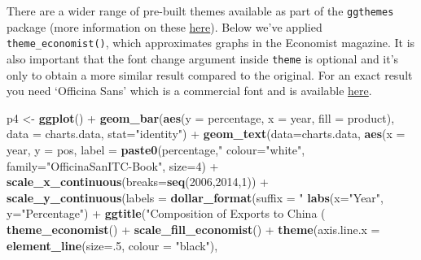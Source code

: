 \documentclass[]{article}
\newenvironment{Shaded}{\begin{snugshade}}{\end{snugshade}}
\newcommand{\KeywordTok}[1]{\textcolor[rgb]{0.13,0.29,0.53}{\textbf{{#1}}}}
\newcommand{\DataTypeTok}[1]{\textcolor[rgb]{0.13,0.29,0.53}{{#1}}}
\newcommand{\DecValTok}[1]{\textcolor[rgb]{0.00,0.00,0.81}{{#1}}}
\newcommand{\StringTok}[1]{\textcolor[rgb]{0.31,0.60,0.02}{{#1}}}
\newcommand{\NormalTok}[1]{{#1}}
\begin{document}
There are a wider range of pre-built themes available as part of the
\texttt{ggthemes} package (more information on these
\href{https://cran.r-project.org/web/packages/ggthemes/vignettes/ggthemes.html}{here}).
Below we've applied \texttt{theme\_economist()}, which approximates
graphs in the Economist magazine. It is also important that the font
change argument inside \texttt{theme} is optional and it's only to
obtain a more similar result compared to the original. For an exact
result you need `Officina Sans' which is a commercial font and is
available \href{http://www.myfonts.com/fonts/itc/officina-sans/}{here}.

\begin{Shaded}
\begin{Highlighting}[]
\NormalTok{p4 <-}\StringTok{ }\KeywordTok{ggplot}\NormalTok{() +}
\StringTok{      }\KeywordTok{geom_bar}\NormalTok{(}\KeywordTok{aes}\NormalTok{(}\DataTypeTok{y =} \NormalTok{percentage, }\DataTypeTok{x =} \NormalTok{year, }\DataTypeTok{fill =} \NormalTok{product), }\DataTypeTok{data =} \NormalTok{charts.data, }\DataTypeTok{stat=}\StringTok{"identity"}\NormalTok{) +}\StringTok{ }
\StringTok{      }\KeywordTok{geom_text}\NormalTok{(}\DataTypeTok{data=}\NormalTok{charts.data, }\KeywordTok{aes}\NormalTok{(}\DataTypeTok{x =} \NormalTok{year, }\DataTypeTok{y =} \NormalTok{pos, }\DataTypeTok{label =} \KeywordTok{paste0}\NormalTok{(percentage,}\StringTok{"%
                \DataTypeTok{colour=}\StringTok{"white"}\NormalTok{, }\DataTypeTok{family=}\StringTok{"OfficinaSanITC-Book"}\NormalTok{, }\DataTypeTok{size=}\DecValTok{4}\NormalTok{) +}\StringTok{ }
\StringTok{      }\KeywordTok{scale_x_continuous}\NormalTok{(}\DataTypeTok{breaks=}\KeywordTok{seq}\NormalTok{(}\DecValTok{2006}\NormalTok{,}\DecValTok{2014}\NormalTok{,}\DecValTok{1}\NormalTok{)) +}\StringTok{ }
\StringTok{      }\KeywordTok{scale_y_continuous}\NormalTok{(}\DataTypeTok{labels =} \KeywordTok{dollar_format}\NormalTok{(}\DataTypeTok{suffix =} \StringTok{"%
\StringTok{      }\KeywordTok{labs}\NormalTok{(}\DataTypeTok{x=}\StringTok{"Year"}\NormalTok{, }\DataTypeTok{y=}\StringTok{"Percentage"}\NormalTok{) +}\StringTok{ }
\StringTok{      }\KeywordTok{ggtitle}\NormalTok{(}\StringTok{"Composition of Exports to China (%
\StringTok{      }\KeywordTok{theme_economist}\NormalTok{() +}\StringTok{ }\KeywordTok{scale_fill_economist}\NormalTok{() +}\StringTok{ }
\StringTok{      }\KeywordTok{theme}\NormalTok{(}\DataTypeTok{axis.line.x =} \KeywordTok{element_line}\NormalTok{(}\DataTypeTok{size=}\NormalTok{.}\DecValTok{5}\NormalTok{, }\DataTypeTok{colour =} \StringTok{"black"}\NormalTok{), }
}}}
\end{Highlighting}
\end{Shaded}
\end{document}
